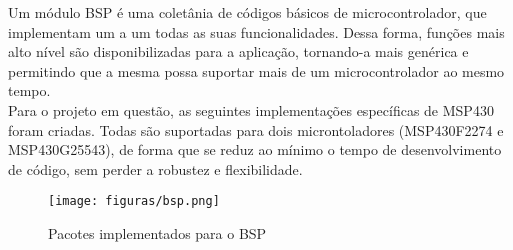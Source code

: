 Um módulo BSP é uma coletânia de códigos básicos de microcontrolador, que implementam um a um todas as suas funcionalidades. Dessa forma, funções mais alto nível são disponibilizadas para a aplicação, tornando-a mais genérica e permitindo que a mesma possa suportar mais de um microcontrolador ao mesmo tempo. \\
Para o projeto em questão, as seguintes implementações específicas de MSP430 foram criadas. Todas são suportadas para dois microntoladores (MSP430F2274 e MSP430G25543), de forma que se reduz ao mínimo o tempo de desenvolvimento de código, sem perder a robustez e flexibilidade.

\begin{figure}[htbp]
	\centering
		\texttt{[image: figuras/bsp.png]}
	\caption{Pacotes implementados para o BSP}
	\label{bsp-scheme}
\end{figure}
